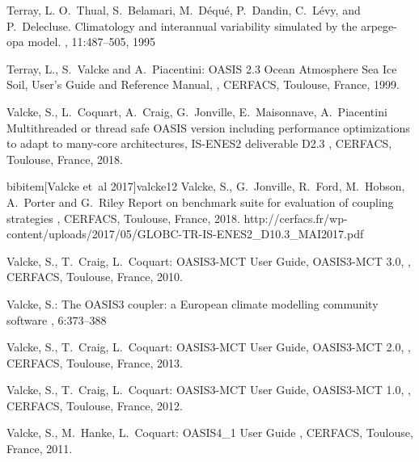 \begin{thebibliography}{10}
Terray, L. O.~Thual, S.~Belamari, M.~D\'equ\'e, P.~Dandin, C.~L\'evy, and
P.~Delecluse. 
\newblock Climatology and interannual variability simulated by the arpege-opa
model. 
, 11:487--505, 1995

Terray, L., S.~Valcke and A.~Piacentini:
\newblock OASIS 2.3 Ocean Atmosphere Sea Ice Soil, User's Guide and
Reference Manual,
, 
\newblock CERFACS, Toulouse, France, 1999.

Valcke, S., L.~Coquart, A.~Craig, G.~Jonville, E.~Maisonnave, A.~Piacentini
\newblock Multithreaded or thread safe OASIS version including performance optimizations to adapt to many-core architectures, IS-ENES2 deliverable D2.3
,  
\newblock CERFACS, Toulouse, France, 2018.

bibitem[{Valcke et~al 2017}]{valcke12}
Valcke, S., G.~Jonville, R.~Ford, M.~Hobson, A.~Porter and G.~Riley
\newblock Report on benchmark suite for evaluation of coupling strategies
,  
\newblock CERFACS, Toulouse, France, 2018.
\newblock http://cerfacs.fr/wp-content/uploads/2017/05/GLOBC-TR-IS-ENES2\_D10.3\_MAI2017.pdf

Valcke, S., T.~Craig, L.~Coquart: 
\newblock OASIS3-MCT User Guide, OASIS3-MCT 3.0, 
,  
\newblock CERFACS, Toulouse, France, 2010.

Valcke, S.: 
\newblock The OASIS3 coupler: a European climate modelling community software
, 6:373--388

Valcke, S., T.~Craig, L.~Coquart: 
\newblock OASIS3-MCT User Guide, OASIS3-MCT 2.0, 
,  
\newblock CERFACS, Toulouse, France, 2013.

Valcke, S., T.~Craig, L.~Coquart: 
\newblock OASIS3-MCT User Guide, OASIS3-MCT 1.0, 
,  
\newblock CERFACS, Toulouse, France, 2012.

Valcke, S., M.~Hanke, L.~Coquart:
\newblock OASIS4\_1 User Guide
, 
\newblock CERFACS, Toulouse, France, 2011. 


\end{thebibliography}
